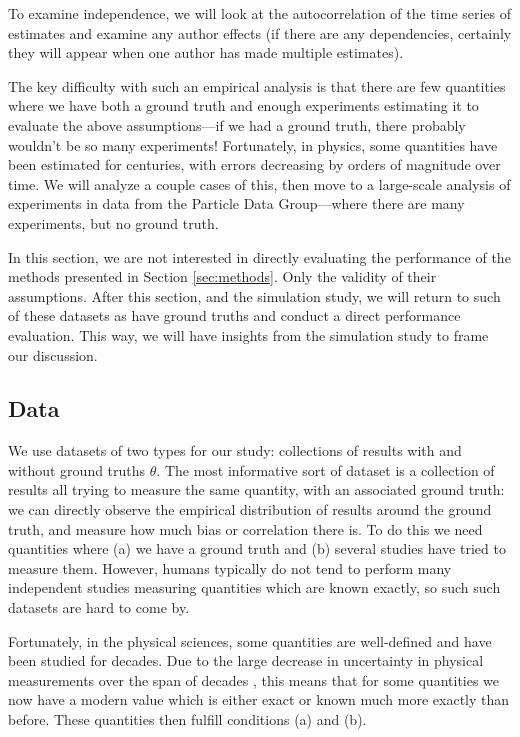 \documentclass[letterpaper,12pt]{article}
\begin{document}
To examine independence, we will look at the autocorrelation of the time series of estimates and examine any author effects (if there are any dependencies, certainly they will appear when one author has made multiple estimates).

The key difficulty with such an empirical analysis is that there are few quantities where we have both a ground truth and enough experiments estimating it to evaluate the above assumptions---if we had a ground truth, there probably wouldn't be so many experiments! Fortunately, in physics, some quantities have been estimated for centuries, with errors decreasing by orders of magnitude over time. We will analyze a couple cases of this, then move to a large-scale analysis of experiments in data from the Particle Data Group---where there are many experiments, but no ground truth.

In this section, we are not interested in directly evaluating the performance of the methods presented in Section \ref{sec:methods}. Only the validity of their assumptions. After this section, and the simulation study, we will return to such of these datasets as have ground truths and conduct a direct performance evaluation. This way, we will have insights from the simulation study to frame our discussion.


\subsection{Data}

We use datasets of two types for our study: collections of results with and without ground truths $\theta$. The most informative sort of dataset is a collection of results all trying to measure the same quantity, with an associated ground truth: we can directly observe the empirical distribution of results around the ground truth, and measure how much bias or correlation there is. To do this we need quantities where (a) we have a ground truth and (b) several studies have tried to measure them. However, humans typically do not tend to perform many independent studies measuring quantities which are known exactly, so such such datasets are hard to come by.

Fortunately, in the physical sciences, some quantities are well-defined and have been studied for decades. Due to the large decrease in uncertainty in physical measurements over the span of decades \citep[sec.~3.5]{bailey2017not}, this means that for some quantities we now have a modern value which is either exact or known much more exactly than before. These quantities then fulfill conditions (a) and (b).
\end{document}
